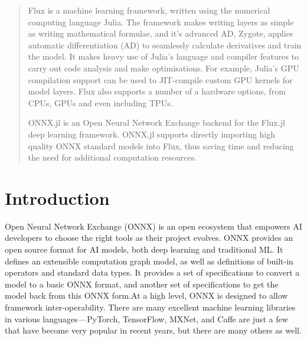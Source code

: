 \documentclass{juliacon}
\begin{document}


\maketitle

\begin{abstract}

Flux\cite{innes:2018} is a machine learning framework, written using the numerical computing language Julia\cite{bezanson2017julia}. The framework makes writing layers as simple as writing mathematical formulae, and it's advanced AD, Zygote\cite{DBLP:journals/corr/abs-1810-07951}, applies automatic differentiation (AD) to seamlessly calculate derivatives and train the model. It makes heavy use of Julia's language and compiler features to carry out code analysis and make optimisations.  For example, Julia's GPU compilation support\cite{besard:2017} can be used to JIT-compile custom GPU kernels for model layers\cite{CuArrays}. Flux also supports a number of a hardware options, from CPUs, GPUs and even including TPUs.\newline

ONNX.jl is an Open Neural Network Exchange backend for the Flux.jl deep learning framework. ONNX.jl supports directly importing high quality ONNX standard models into Flux, thus saving time and reducing the need for additional computation resources.

\end{abstract}

\section{Introduction}

Open Neural Network Exchange (ONNX) is an open ecosystem that empowers AI developers to choose the right tools as their project evolves. ONNX provides an open source format for AI models, both deep learning and traditional ML. It defines an extensible computation graph model, as well as definitions of built-in operators and standard data types. It provides a set of specifications to convert a model to a basic ONNX format, and another set of specifications to get the model back from this ONNX form.\newline  At a high level, ONNX is designed to allow framework inter-operability. There are many excellent machine learning libraries in various languages — PyTorch, TensorFlow, MXNet, and Caffe are just a few that have become very popular in recent years, but there are many others as well.
\end{document}
